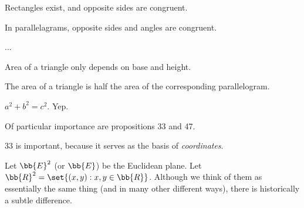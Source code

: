 \documentclass{article}
\begin{document}
\begin{lm}[title=Prop. 33]
    Rectangles exist, and opposite sides are congruent.
\end{lm}

\begin{lm}[title=Prop. 34]
    In parallelagrams, opposite sides and angles are congruent.
\end{lm}

...

\begin{lm}[title=Prop. 37/38]
    Area of a triangle only depends on base and height.
\end{lm}

\begin{lm}[title=Prop. 41]
    The area of a triangle is half the area of the corresponding parallelogram.
\end{lm}

\begin{lm}[title=Prop. 47]
    $ a^{2}+b^{2} = c^{2} $. Yep.
\end{lm}
Of particular importance are propositions 33 and 47.

33 is important, because it serves as the basis of \textit{coordinates}.

Let $ \bb{E}^{2} $ (or $ \bb{E} $) be the Euclidean plane.
Let $ \bb{R}^{2} = \set{(x,y): x,y \in \bb{R}} $.
Although we think of them as essentially the same thing (and in many other different ways), there
is historically a subtle difference.
\end{document}

